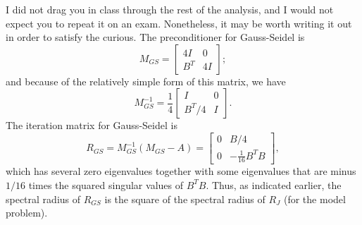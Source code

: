 I did not drag you in class through the rest of the analysis, and I
would not expect you to repeat it on an exam.  Nonetheless, it may be
worth writing it out in order to satisfy the curious.
The preconditioner for Gauss-Seidel is
\[
  M_{GS} = \begin{bmatrix} 4I & 0 \\ B^T & 4I \end{bmatrix};
\]
and because of the relatively simple form of this matrix, we have
\[
  M_{GS}^{-1} =
  \frac{1}{4}
  \begin{bmatrix}
    I & 0 \\
    B^T/4 & I
  \end{bmatrix}.
\]
The iteration matrix for Gauss-Seidel is
\[
  R_{GS} = M_{GS}^{-1} (M_{GS}-A) =
  \begin{bmatrix} 0 & B/4 \\ 0 & -\frac{1}{16} B^T B \end{bmatrix},
\]
which has several zero eigenvalues together with some eigenvalues that
are minus $1/16$ times the squared singular values of $B^T B$.  Thus,
as indicated earlier, the spectral radius of $R_{GS}$ is the square of
the spectral radius of $R_{J}$ (for the model problem).

